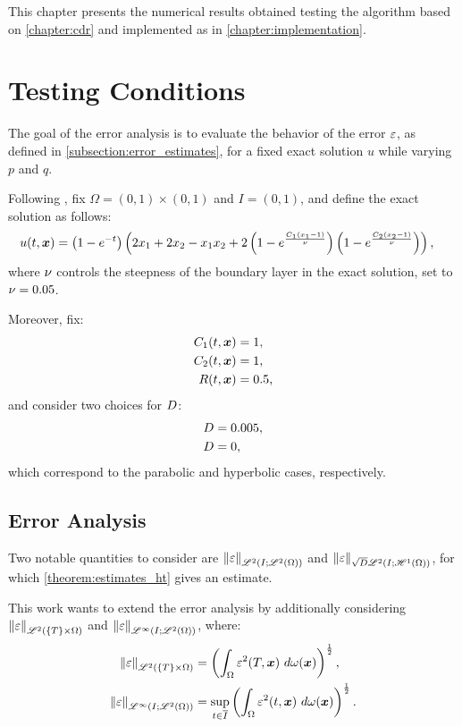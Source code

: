 This chapter presents the numerical results obtained testing the algorithm based on \cref{chapter:cdr} and implemented as in \cref{chapter:implementation}.

\section{Testing Conditions}

The goal of the error analysis is to evaluate the behavior of the error $\varepsilon$, as defined in \cref{subsection:error_estimates}, for a fixed exact solution $u$ while varying $p$ and $q$.

Following \cite{Feistauer2007}, fix $\Omega = \left( 0, 1 \right) \times \left( 0, 1 \right)$ and $I = \left( 0, 1 \right)$, and define the exact solution as follows:
\begin{align}
    u(t, \bm{x}) &= \left( 1 - e^{-t} \right) \left( 2 x_1 + 2 x_2 - x_1 x_2 + 2 \left( 1 - e^{\frac{C_1 \left( x_1 - 1 \right) }{\nu}} \right) \left( 1 - e^{\frac{C_2 \left( x_2 - 1 \right) }{\nu}} \right) \right),
\end{align}
where $\nu$ controls the steepness of the boundary layer in the exact solution, set to $\nu = 0.05$.

Moreover, fix:
\begin{align}
    C_1(t, \bm{x}) &= 1, \\
    C_2(t, \bm{x}) &= 1, \\
    R(t, \bm{x}) &= 0.5,
\end{align}
and consider two choices for $D$:
\begin{align}
    D &= 0.005, \\
    D &= 0,
\end{align}
which correspond to the parabolic and hyperbolic cases, respectively.

\newpage
\subsection{Error Analysis}

Two notable quantities to consider are $\left\lVert \varepsilon \right\rVert_{\mathscr{L}^{2}(I; \mathscr{L}^{2}(\Omega))}$ and $\left\lVert \varepsilon \right\rVert_{\sqrt{D} \mathscr{L}^{2}(I; \mathscr{H}^{1}(\Omega))}$, for which \cref{theorem:estimates_ht} gives an estimate. 

This work wants to extend the error analysis by additionally considering $\left\lVert \varepsilon \right\rVert_{\mathscr{L}^{2}(\left\{ T \right\} \times \Omega)}$ and $\left\lVert \varepsilon \right\rVert_{\mathscr{L}^{\infty}(I; \mathscr{L}^{2}(\Omega))}$, where:
\begin{align}
    \left\lVert \varepsilon \right\rVert_{\mathscr{L}^{2}(\left\{ T \right\} \times \Omega)} &= \left( \int_{\Omega} \varepsilon^2(T, \bm{x}) ~ d \omega (\bm{x}) \right)^{\frac12}, \\
    \left\lVert \varepsilon \right\rVert_{\mathscr{L}^{\infty}(I; \mathscr{L}^{2}(\Omega))} &= \sup_{t \in \overline{I}} \left( \int_{\Omega} \varepsilon^2(t, \bm{x}) ~ d \omega (\bm{x}) \right)^{\frac12}.
\end{align}

